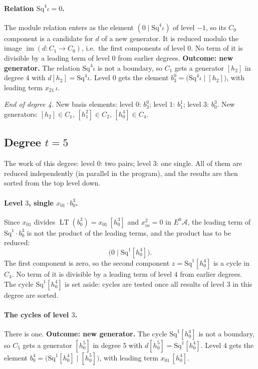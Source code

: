 \documentclass[11pt]{article}
\newcommand{\Sq}{\mathrm{Sq}}
\newcommand{\A}{\mathcal{A}}
\DeclareMathOperator{\LT}{LT}
\begin{document}
\paragraph{Relation $\Sq^{4}\iota = 0$.} The module relation enters as the element $(0 \mid \Sq^{4}\iota)$ of level $-1$, so its $C_0$ component is a candidate for $d$ of a new generator. It is reduced modulo the image $\operatorname{im}(d\colon C_1\to C_0)$, i.e.\ the first components of level $0$.
No term of it is divisible by a leading term of level $0$ from earlier degrees.
\textbf{Outcome: new generator.} The relation $\Sq^{4}\iota$ is not a boundary, so $C_{1}$ gets a generator $[h_2]$ in degree $4$ with $d[h_2] = \Sq^{4}\iota$.
Level $0$ gets the element $b^{0}_{3} = \bigl(\Sq^{4}\iota \;\big|\; [h_2]\bigr)$, with leading term $x_{21}\,\iota$.
\medskip
\par\noindent\emph{End of degree 4.} New basis elements: level $0$: $b^{0}_{3}$; level $1$: $b^{1}_{1}$; level $3$: $b^{3}_{0}$. New generators: $[h_2]\in C_{1}$, $[h_1^2]\in C_{2}$, $[h_0^4]\in C_{4}$.
\subsection*{Degree $t = 5$}
\noindent The work of this degree: level $0$: two pairs; level $3$: one single. All of them are reduced independently (in parallel in the program), and the results are then sorted from the top level down.
\medskip
\paragraph{Level $3$, single $x_{01}\cdot b^{3}_{0}$.} Since $x_{01}$ divides $\LT(b^{3}_{0}) = x_{01}\,[h_0^3]$ and $x_{in}^2 = 0$ in $E^0\A$, the leading term of $\Sq^{1}\cdot b^{3}_{0}$ is not the product of the leading terms, and the product has to be reduced:
\[\bigl(0 \;\big|\; \Sq^{1}[h_0^4]\bigr).\]
The first component is zero, so the second component $z = \Sq^{1}[h_0^4]$ is a cycle in $C_{4}$.
No term of it is divisible by a leading term of level $4$ from earlier degrees.
The cycle $\Sq^{1}[h_0^4]$ is set aside: cycles are tested once all results of level $3$ in this degree are sorted.
\medskip
\paragraph{The cycles of level $3$.} There is one.
\textbf{Outcome: new generator.} The cycle $\Sq^{1}[h_0^4]$ is not a boundary, so $C_{5}$ gets a generator $[h_0^5]$ in degree $5$ with $d[h_0^5] = \Sq^{1}[h_0^4]$.
Level $4$ gets the element $b^{4}_{0} = \bigl(\Sq^{1}[h_0^4] \;\big|\; [h_0^5]\bigr)$, with leading term $x_{01}\,[h_0^4]$.
\medskip
\end{document}
